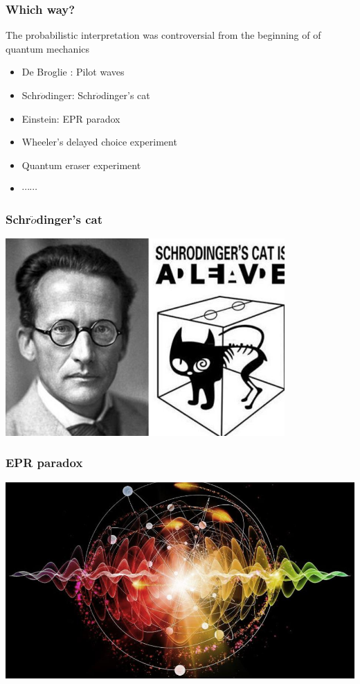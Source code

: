 \begin{frame}
    \frametitle{Which way?}
    The probabilistic interpretation was controversial from the beginning of of quantum mechanics
    \begin{itemize}
        \item De Broglie : Pilot waves
        \item Schr$\ddot{o}$dinger: Schr$\ddot{o}$dinger's cat
        \item Einstein: EPR paradox
        \item Wheeler's delayed choice experiment
        \item Quantum eraser experiment
        \item $\cdots \cdots$
    \end{itemize}
\end{frame}

\begin{frame}
    \frametitle{Schr$\ddot{o}$dinger's cat}
    \begin{center}
        \includegraphics[width=0.8\textwidth]{figs/cat.jpeg} \\
    \end{center} 
\end{frame}

\begin{frame}
    \frametitle{EPR paradox}
    \begin{center}
        \includegraphics[width=1.0\textwidth]{figs/EPR.jpeg} \\
    \end{center} 
\end{frame}

